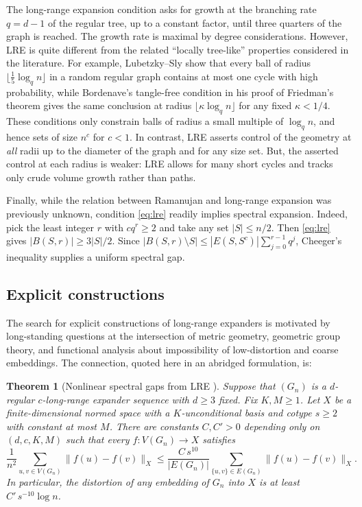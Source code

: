 \documentclass[11pt,reqno]{amsart}
\newtheorem{theorem}{Theorem}[section]
\theoremstyle{definition}
\begin{document}
The long-range expansion condition asks for growth at the branching rate $q=d-1$ of the regular tree, up to a constant factor, until three quarters of the graph is reached. The growth rate is maximal by degree considerations. However, LRE is quite different from the related ``locally tree-like'' properties considered in the literature. For example, Lubetzky--Sly \cite[Lemma~2.1]{LS} show that every ball of radius $\lfloor\frac15\log_q n\rfloor$ in a random regular graph contains at most one cycle with high probability, while Bordenave's tangle-free condition in his proof of Friedman's theorem \cite{Friedman,Bordenave} gives the same conclusion at radius $\lfloor\kappa\log_q n\rfloor$ for any fixed $\kappa<1/4$. These conditions only constrain balls of radius a small multiple of $\log_q n$, and hence sets of size $n^{c}$ for $c < 1$. In contrast, LRE asserts control of the geometry at \textit{all} radii up to the diameter of the graph and for any size set. But, the asserted control at each radius is weaker: LRE allows for many short cycles and tracks only crude volume growth rather than paths.


Finally, while the relation between Ramanujan and long-range expansion was previously unknown, condition \eqref{eq:lre} readily implies spectral expansion. Indeed, pick the least integer $r$ with $cq^r\ge2$ and take any set $|S|\le n/2$. Then \eqref{eq:lre} gives $|B(S,r)|\ge3|S|/2$. Since $|B(S,r)\setminus S|\le |E(S,S^c)|\sum_{j=0}^{r-1}q^j$, Cheeger's inequality \cite{LPW} supplies a uniform spectral gap. 



\subsection{Explicit constructions}
The search for explicit constructions of long-range expanders is motivated by long-standing questions at the intersection of metric geometry, geometric group theory, and functional analysis about impossibility of low-distortion and coarse embeddings. The connection, quoted here in an abridged formulation, is:

\begin{theorem}[Nonlinear spectral gaps from LRE \cite{ADTT}]\label{thm:nonlinear-background}
Suppose that $(G_n)$ is a $d$-regular $c$-long-range expander sequence with $d \ge 3$ fixed.
Fix $K,M\ge1$. Let $X$ be a finite-dimensional normed space with a
$K$-unconditional basis and cotype $s\ge2$ with constant at most $M$.
There are constants $C,C'>0$ depending only on $(d,c,K,M)$ such that every $f:V(G_n)\to X$ satisfies
\begin{equation}\label{eq:nonlinear-poincare}
 \frac1{n^2}\sum_{u,v\in V(G_n)}\|f(u)-f(v)\|_X
 \le\frac{C\, s^{10}}{|E(G_n)|}
       \sum_{\{u,v\}\in E(G_n)}\|f(u)-f(v)\|_X.
\end{equation}
In particular, the distortion of any embedding of $G_n$ into $X$ is
at least $C'\, s^{-10}\log n$.
\end{theorem}
\end{document}
